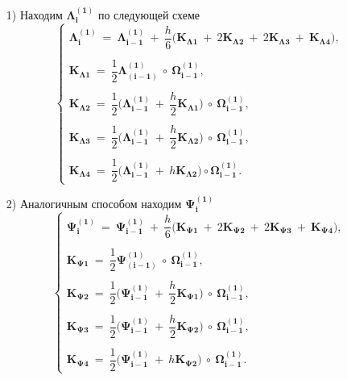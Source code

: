 \documentclass[14pt]{extreport}
\begin{document}
\begin{itemize}
\item[1)] Находим $\boldsymbol{\Lambda_i^{(1)}}$ по следующей схеме  
\begin{equation}
\begin{cases}
\boldsymbol{\Lambda_i^{(1)}}\ =\ \boldsymbol{\Lambda_{i-1}^{(1)}}\ +\ \dfrac{h}{6}\bigg( \boldsymbol{K_{\Lambda1}}\ +\ 2\boldsymbol{K_{\Lambda2}}\ +\ 2\boldsymbol{K_{\Lambda3}}\ +\ \boldsymbol{K_{\Lambda4}} \bigg), \\ \\
\boldsymbol{K_{\Lambda1}}\ =\ \dfrac{1}{2}\boldsymbol{\Lambda_{(i - 1)}^{(1)}}\ \circ\ \boldsymbol{\Omega_{i - 1}^{(1)}}, \\ \\
\boldsymbol{K_{\Lambda2}}\ =\ \dfrac{1}{2}\bigg(\boldsymbol{\Lambda_{i - 1}^{(1)}}\ +\ \dfrac{h}{2}\boldsymbol{K_{\Lambda1}}\bigg)\ \circ\ \boldsymbol{\Omega_{i-1}^{(1)}},\\ \\
\boldsymbol{K_{\Lambda3}}\ =\ \dfrac{1}{2}\bigg(\boldsymbol{\Lambda_{i - 1}^{(1)}}\ +\ \dfrac{h}{2}\boldsymbol{K_{\Lambda2}}\bigg)\ \circ\ \boldsymbol{\Omega_{i-1}^{(1)}},\\ \\
\boldsymbol{K_{\Lambda4}}\ =\ \dfrac{1}{2}\bigg(\boldsymbol{\Lambda_{i - 1}^{(1)}}\ +\ h\boldsymbol{K_{\Lambda2}}\bigg) \circ \boldsymbol{\Omega_{i-1}^{(1)}}.
 \end{cases}
 \end{equation}
 
 \item[2)] Аналогичным способом находим $\boldsymbol{\Psi_i^{(1)}}$
\begin{equation}
\begin{cases}
\boldsymbol{\Psi_i^{(1)}}\ =\ \boldsymbol{\Psi_{i-1}^{(1)}}\ +\ \dfrac{h}{6}\bigg( \boldsymbol{K_{\Psi1}}\ +\ 2\boldsymbol{K_{\Psi2}}\ +\ 2\boldsymbol{K_{\Psi3}}\ +\ \boldsymbol{K_{\Psi4}} \bigg), \\ \\
\boldsymbol{K_{\Psi1}}\ =\ \dfrac{1}{2}\boldsymbol{\Psi_{(i - 1)}^{(1)}}\ \circ\ \boldsymbol{\Omega_{i - 1}^{(1)}}, \\ \\
\boldsymbol{K_{\Psi2}}\ =\ \dfrac{1}{2}\bigg(\boldsymbol{\Psi_{i - 1}^{(1)}}\ +\ \dfrac{h}{2}\boldsymbol{K_{\Psi1}}\bigg)\ \circ\ \boldsymbol{\Omega_{i-1}^{(1)}},\\ \\
\boldsymbol{K_{\Psi3}}\ =\ \dfrac{1}{2}\bigg(\boldsymbol{\Psi_{i - 1}^{(1)}}\ +\ \dfrac{h}{2}\boldsymbol{K_{\Psi2}}\bigg)\ \circ\ \boldsymbol{\Omega_{i-1}^{(1)}},\\ \\
\boldsymbol{K_{\Psi4}}\ =\ \dfrac{1}{2}\bigg(\boldsymbol{\Psi_{i - 1}^{(1)}}\ +\ h\boldsymbol{K_{\Psi2}}\bigg)\ \circ\ \boldsymbol{\Omega_{i-1}^{(1)}}.
 \end{cases}
\end{equation}


\end{itemize}
\end{document}
